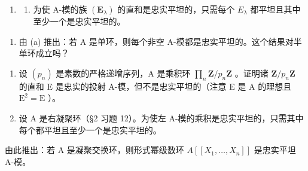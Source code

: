 
\begin{enumerate}
\def\labelenumi{\arabic{enumi}.}
\tightlist
\item
  \begin{enumerate}
  \def\labelenumii{(\alph{enumii})}
  \tightlist
  \item
  为使 A-模的族 \((\mathbf{E}_{\lambda})\) 的直和是忠实平坦的，只需每个 \(E_{\lambda}\) 都平坦且其中至少一个是忠实平坦的。
  \end{enumerate}
\end{enumerate}

\begin{enumerate}
\def\labelenumi{(\alph{enumi})}
\setcounter{enumi}{1}
\tightlist
\item
由 (a) 推出：若 A 是单环，则每个非空 A-模都是忠实平坦的。这个结果对半单环成立吗？
\end{enumerate}

\begin{enumerate}
\def\labelenumi{\arabic{enumi}.}
\setcounter{enumi}{1}
\item
设 \((p_n)\) 是素数的严格递增序列，A 是乘积环 \(\prod_{n} \mathbf{Z} / p_n \mathbf{Z}\) 。证明诸 \(\mathbf{Z} / p_n \mathbf{Z}\) 的直和 E 是忠实的投射 A-模，但不是忠实平坦的（注意 E 是 A 的理想且 \(\mathrm{E}^2 = \mathrm{E}\) ）。
\item
设 A 是右凝聚环（§2 习题 12）。为使左 A-模的乘积是忠实平坦的，只需其中每个都平坦且至少一个是忠实平坦的。
\end{enumerate}

由此推出：若 A 是凝聚交换环，则形式幂级数环 \(A[[X_{1},\ldots,X_{n}]]\) 是忠实平坦 A-模。

